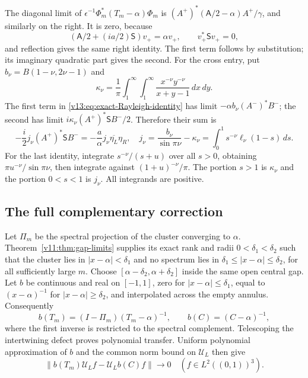 The diagonal limit of $\epsilon^{-1}\Phi_m^*(T_m-\alpha)\Phi_m$
is $(A^+)^*(\mathsf A/2-\alpha)A^+/\gamma$, and similarly on the
right.  It is zero, because
\[
 (\mathsf A/2+(ia/2)\mathsf S)v_+=\alpha v_+,
 \qquad v_+^*\mathsf Sv_+=0,
\]
and reflection gives the same right identity.  The first term follows
by substitution; its imaginary quadratic part gives the second.
For the cross entry, put $b_\nu=B(1-\nu,2\nu-1)$ and
\[
 \kappa_\nu=\frac1\pi\int_1^\infty\int_1^\infty
                \frac{x^{-\nu}y^{-\nu}}{x+y-1}\,dx\,dy.
\]
The first term in \eqref{v13:eq:exact-Rayleigh-identity} has limit
$-\alpha b_\nu(A^-)^*B^-$; the second has limit
$i\kappa_\nu(A^+)^*\mathsf SB^-/2$.  Therefore their sum is
\begin{equation}\label{v13:eq:direct-cross-limit}
 -\frac i2j_\nu(A^+)^*\mathsf SB^-
 =-\frac a\alpha j_\nu\overline{\eta_L}\eta_R,
 \quad
 j_\nu=\frac{b_\nu}{\sin\pi\nu}-\kappa_\nu
      =\int_0^1s^{-\nu}\ell_\nu(1-s)\,ds.
\end{equation}
For the last identity, integrate $s^{-\nu}/(s+u)$ over all $s>0$,
obtaining $\pi u^{-\nu}/\sin\pi\nu$, then integrate against
$(1+u)^{-\nu}/\pi$.  The portion $s>1$ is $\kappa_\nu$ and the
portion $0<s<1$ is $j_\nu$.  All integrands are positive.

\subsection{The full complementary correction}

Let $\Pi_m$ be the spectral projection of the cluster converging to
$\alpha$.  Theorem~\ref{v11:thm:gap-limits} supplies its exact rank
and radii $0<\delta_1<\delta_2$ such that the cluster lies in
$|x-\alpha|<\delta_1$ and no spectrum lies in
$\delta_1\le |x-\alpha|\le\delta_2$, for all sufficiently large $m$.
Choose $[\alpha-\delta_2,\alpha+\delta_2]$ inside the same open
central gap. Let $b$ be continuous and real on $[-1,1]$, zero for
$|x-\alpha|\le\delta_1$, equal to $(x-\alpha)^{-1}$ for
$|x-\alpha|\ge\delta_2$, and interpolated across the empty annulus.
Consequently
\[
 b(T_m)=(I-\Pi_m)(T_m-\alpha)^{-1},\qquad
 b(C)=(C-\alpha)^{-1},
\]
where the first inverse is restricted to the spectral complement.
Telescoping the intertwining defect proves polynomial transfer.
Uniform polynomial approximation of $b$ and the common norm bound on
$\mathcal U_L$ then give
\[
 \|b(T_m)\mathcal U_Lf-\mathcal U_Lb(C)f\|\to0
 \quad(f\in L^2((0,1))^3).
\]

